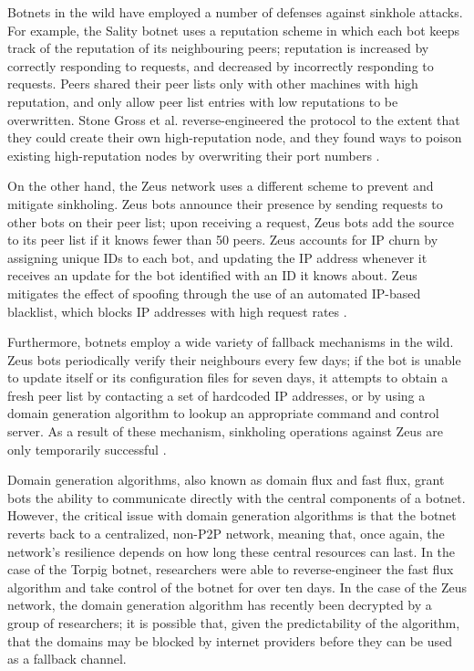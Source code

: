 \documentclass{acm_proc_article-sp}
\begin{document}
Botnets in the wild have employed a number of defenses against sinkhole attacks.  For example, the Sality botnet uses a reputation scheme in which each bot keeps track of the reputation of its neighbouring peers; reputation is increased by correctly responding to requests, and decreased by incorrectly responding to requests. Peers shared their peer lists only with other machines with high reputation, and only allow peer list entries with low reputations to be overwritten. Stone Gross et al. reverse-engineered the protocol to the extent that they could create their own high-reputation node, and they found ways to poison existing high-reputation nodes by overwriting their port numbers \cite{stone:p2p}.

On the other hand, the Zeus network uses a different scheme to prevent and mitigate sinkholing. Zeus bots announce their presence by sending requests to other bots on their peer list; upon receiving a request, Zeus bots add the source to its peer list if it knows fewer than 50 peers.  Zeus accounts for IP churn by assigning unique IDs to each bot, and updating the IP address whenever it receives an update for the bot identified with an ID it knows about.  Zeus mitigates the effect of spoofing through the use of an automated IP-based blacklist, which blocks IP addresses with high request rates \cite{stone:p2p}.

Furthermore, botnets employ a wide variety of fallback mechanisms in the wild.  Zeus bots periodically verify their neighbours every few days; if the bot is unable to update itself or its configuration files for seven days, it attempts to obtain a fresh peer list by contacting a set of hardcoded IP addresses, or by using a domain generation algorithm to lookup an appropriate command and control server.  As a result of these mechanism, sinkholing operations against Zeus are only temporarily successful \cite{stone:p2p}.

Domain generation algorithms, also known as domain flux and fast flux, grant bots the ability to communicate directly with the central components of a botnet.  However, the critical issue with domain generation algorithms is that the botnet reverts back to a centralized, non-P2P network, meaning that, once again, the network's resilience depends on how long these central resources can last.  In the case of the Torpig botnet, researchers were able to reverse-engineer the fast flux algorithm and take control of the botnet for over ten days\cite{stone:takeover}.  In the case of the Zeus network, the domain generation algorithm has recently been decrypted by a group of researchers; it is possible that, given the predictability of the algorithm, that the domains may be blocked by internet providers before they can be used as a fallback channel\cite{zeus:protocol}.
\end{document}
